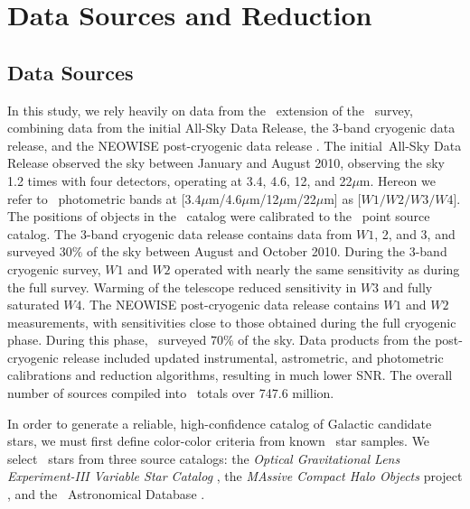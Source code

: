 \section{Data Sources and Reduction}
\label{sec:data}


\subsection{Data Sources}
\label{sec:sources}
In this study, we rely heavily on data from the \allwise\, extension of the \wise\, survey, combining data from the initial All-Sky Data Release, the 3-band cryogenic data release, and the NEOWISE post-cryogenic data release \citep{2013wise.rept....1C}. The initial \wise\,All-Sky Data Release observed the sky between January and August 2010, observing the sky 1.2 times with four detectors, operating at 3.4, 4.6, 12, and 22$\mu$m. Hereon we refer to \allwise\, photometric bands at [3.4$\mu$m/4.6$\mu$m/12$\mu$m/22$\mu$m] as [$W1/W2/W3/W4$]. The positions of objects in the \wise\, catalog were calibrated to the \twomass\, point source catalog. The 3-band cryogenic data release contains data from $W1$, 2, and 3, and surveyed $30\%$ of the sky between August and October 2010. During the 3-band cryogenic survey, $W1$ and $W2$ operated with nearly the same sensitivity as during the full survey. Warming of the telescope reduced sensitivity in $W3$ and fully saturated $W4$. The NEOWISE post-cryogenic data release contains $W1$ and $W2$ measurements, with sensitivities close to those obtained during the full cryogenic phase. During this phase, \wise\, surveyed $70\%$ of the sky. Data products from the post-cryogenic release included updated instrumental, astrometric, and photometric calibrations and reduction algorithms, resulting in much lower SNR. The overall number of sources compiled into \allwise\, totals over 747.6 million.

In order to generate a reliable, high-confidence catalog of Galactic candidate \agb\, stars, we must first define color-color criteria from known \agb\, star samples. We select \agb\, stars from three source catalogs: the {\it Optical Gravitational Lens Experiment-III Variable Star Catalog} \citep[\ogle,][]{2008AcA....58...69U,2009AcA....59..239S,2011AcA....61..217S}, the {\it MAssive Compact Halo Objects} project \citep[\macho,][]{1997ApJ...482...89A}, and the \simbad\, Astronomical Database \citep{2000A&AS..143....9W}. 

